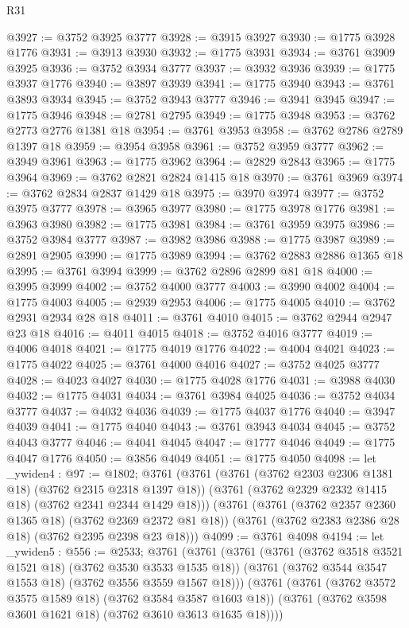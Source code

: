\begin{lexlean}{R31}
\begin{coremodule}
@3927 := @3752 @3925 @3777
@3928 := @3915 @3927
@3930 := @1775 @3928 @1776
@3931 := @3913 @3930
@3932 := @1775 @3931
@3934 := @3761 @3909 @3925
@3936 := @3752 @3934 @3777
@3937 := @3932 @3936
@3939 := @1775 @3937 @1776
@3940 := @3897 @3939
@3941 := @1775 @3940
@3943 := @3761 @3893 @3934
@3945 := @3752 @3943 @3777
@3946 := @3941 @3945
@3947 := @1775 @3946
@3948 := @2781 @2795
@3949 := @1775 @3948
@3953 := @3762 @2773 @2776 @1381 @18
@3954 := @3761 @3953
@3958 := @3762 @2786 @2789 @1397 @18
@3959 := @3954 @3958
@3961 := @3752 @3959 @3777
@3962 := @3949 @3961
@3963 := @1775 @3962
@3964 := @2829 @2843
@3965 := @1775 @3964
@3969 := @3762 @2821 @2824 @1415 @18
@3970 := @3761 @3969
@3974 := @3762 @2834 @2837 @1429 @18
@3975 := @3970 @3974
@3977 := @3752 @3975 @3777
@3978 := @3965 @3977
@3980 := @1775 @3978 @1776
@3981 := @3963 @3980
@3982 := @1775 @3981
@3984 := @3761 @3959 @3975
@3986 := @3752 @3984 @3777
@3987 := @3982 @3986
@3988 := @1775 @3987
@3989 := @2891 @2905
@3990 := @1775 @3989
@3994 := @3762 @2883 @2886 @1365 @18
@3995 := @3761 @3994
@3999 := @3762 @2896 @2899 @81 @18
@4000 := @3995 @3999
@4002 := @3752 @4000 @3777
@4003 := @3990 @4002
@4004 := @1775 @4003
@4005 := @2939 @2953
@4006 := @1775 @4005
@4010 := @3762 @2931 @2934 @28 @18
@4011 := @3761 @4010
@4015 := @3762 @2944 @2947 @23 @18
@4016 := @4011 @4015
@4018 := @3752 @4016 @3777
@4019 := @4006 @4018
@4021 := @1775 @4019 @1776
@4022 := @4004 @4021
@4023 := @1775 @4022
@4025 := @3761 @4000 @4016
@4027 := @3752 @4025 @3777
@4028 := @4023 @4027
@4030 := @1775 @4028 @1776
@4031 := @3988 @4030
@4032 := @1775 @4031
@4034 := @3761 @3984 @4025
@4036 := @3752 @4034 @3777
@4037 := @4032 @4036
@4039 := @1775 @4037 @1776
@4040 := @3947 @4039
@4041 := @1775 @4040
@4043 := @3761 @3943 @4034
@4045 := @3752 @4043 @3777
@4046 := @4041 @4045
@4047 := @1777 @4046
@4049 := @1775 @4047 @1776
@4050 := @3856 @4049
@4051 := @1775 @4050
@4098 := let _ywiden4 : @97 := @1802;
  @3761
    (@3761
      (@3761 (@3762 @2303 @2306 @1381 @18) (@3762 @2315 @2318 @1397 @18))
      (@3761 (@3762 @2329 @2332 @1415 @18) (@3762 @2341 @2344 @1429 @18)))
    (@3761
      (@3761 (@3762 @2357 @2360 @1365 @18) (@3762 @2369 @2372 @81 @18))
      (@3761 (@3762 @2383 @2386 @28 @18) (@3762 @2395 @2398 @23 @18)))
@4099 := @3761 @4098
@4194 := let _ywiden5 : @556 := @2533;
  @3761
    (@3761
      (@3761
        (@3761 (@3762 @3518 @3521 @1521 @18) (@3762 @3530 @3533 @1535 @18))
        (@3761 (@3762 @3544 @3547 @1553 @18) (@3762 @3556 @3559 @1567 @18)))
      (@3761
        (@3761 (@3762 @3572 @3575 @1589 @18) (@3762 @3584 @3587 @1603 @18))
        (@3761 (@3762 @3598 @3601 @1621 @18) (@3762 @3610 @3613 @1635 @18))))

\end{coremodule}
\end{lexlean}
